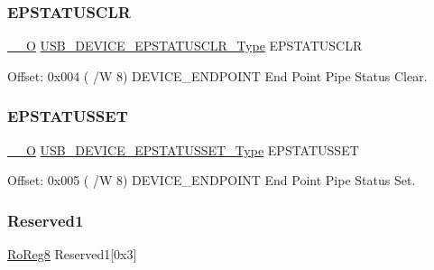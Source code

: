 \mbox{\label{struct_usb_device_endpoint_aadd29fcc878d56d2a66993c66f5aebea}} 
\subsubsection{\texorpdfstring{EPSTATUSCLR}{EPSTATUSCLR}}
{\footnotesize\ttfamily \mbox{\hyperlink{core__cm0plus_8h_a7e25d9380f9ef903923964322e71f2f6}{\+\_\+\+\_\+O}} \mbox{\hyperlink{union_u_s_b___d_e_v_i_c_e___e_p_s_t_a_t_u_s_c_l_r___type}{U\+S\+B\+\_\+\+D\+E\+V\+I\+C\+E\+\_\+\+E\+P\+S\+T\+A\+T\+U\+S\+C\+L\+R\+\_\+\+Type}} E\+P\+S\+T\+A\+T\+U\+S\+C\+LR}



Offset\+: 0x004 ( /W 8) D\+E\+V\+I\+C\+E\+\_\+\+E\+N\+D\+P\+O\+I\+NT End Point Pipe Status Clear. 

\mbox{\label{struct_usb_device_endpoint_a0599cae0d7041b16761adf0b17bf2997}} 
\subsubsection{\texorpdfstring{EPSTATUSSET}{EPSTATUSSET}}
{\footnotesize\ttfamily \mbox{\hyperlink{core__cm0plus_8h_a7e25d9380f9ef903923964322e71f2f6}{\+\_\+\+\_\+O}} \mbox{\hyperlink{union_u_s_b___d_e_v_i_c_e___e_p_s_t_a_t_u_s_s_e_t___type}{U\+S\+B\+\_\+\+D\+E\+V\+I\+C\+E\+\_\+\+E\+P\+S\+T\+A\+T\+U\+S\+S\+E\+T\+\_\+\+Type}} E\+P\+S\+T\+A\+T\+U\+S\+S\+ET}



Offset\+: 0x005 ( /W 8) D\+E\+V\+I\+C\+E\+\_\+\+E\+N\+D\+P\+O\+I\+NT End Point Pipe Status Set. 

\mbox{\label{struct_usb_device_endpoint_a0ec4ccebd5bfbf4f17510e15a5a9ff81}} 
\subsubsection{\texorpdfstring{Reserved1}{Reserved1}}
{\footnotesize\ttfamily \mbox{\hyperlink{group___s_a_m_d21_e15_a__definitions_ga0d957f1433aaf5d70e4dc2b68288442d}{Ro\+Reg8}} Reserved1\mbox{[}0x3\mbox{]}}

